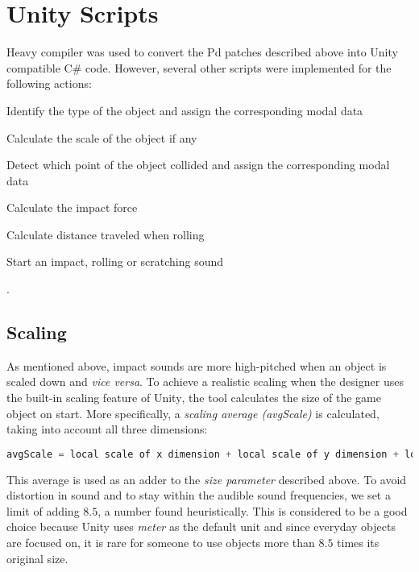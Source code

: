 \section{Unity\textsuperscript{\textregistered} Scripts}
Heavy \cite{bib:heavy} compiler was used to convert the \gls{Pd} patches described above into Unity\textsuperscript{\textregistered} compatible C\# code. However, several other scripts were implemented for the following actions: 
\begin{inparaenum}[1)]
\item Identify the type of the object and assign the corresponding modal data
\item Calculate the scale of the object if any
\item Detect which point of the object collided and assign the corresponding modal data
\item Calculate the impact force
\item Calculate distance traveled when rolling
\item Start an impact, rolling or scratching sound 
\end{inparaenum}.   

\subsection{Scaling}
As mentioned above, impact sounds are more high-pitched when an object is scaled down and \textit{vice versa}. To achieve a realistic scaling when the designer uses the built-in scaling feature of Unity\textsuperscript{\textregistered}, the tool calculates the size of the game object on start. More specifically, a \textit{scaling average (avgScale)} is calculated, taking into account all three dimensions:

\begin{lstlisting}[language=C]
avgScale = local scale of x dimension + local scale of y dimension + local scale of z dimension / 3
\end{lstlisting}

This average is used as an adder to the \textit{size parameter} described above. To avoid distortion in sound and to stay within the audible sound frequencies, we set a limit of adding $8.5$, a number found heuristically. This is considered to be a good choice because Unity\textsuperscript{\textregistered} uses \textit{meter} as the default unit and since everyday objects are focused on, it is rare for someone to use objects more than $8.5$ times its original size.

